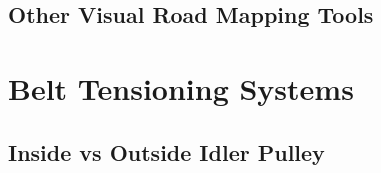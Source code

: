 \subsection{Other Visual Road Mapping Tools\label{sec:literatureReview:roadmap:otherTools}}

\section{Belt Tensioning Systems\label{sec:literatureReview:beltTension}}

\subsection{Inside vs Outside Idler Pulley\label{sec:literatureReview:beltTension:idler}}
